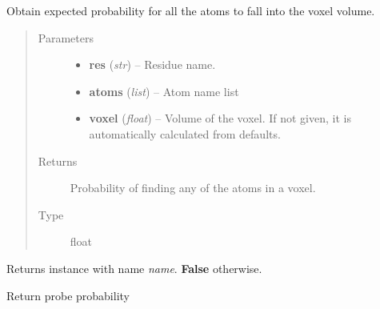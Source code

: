 \documentclass[letterpaper,10pt,english]{sphinxmanual}
\begin{document}
\begin{fulllineitems}
\begin{fulllineitems}
\end{fulllineitems}


\begin{fulllineitems}
\label{solvents:pyMDMix.Solvents.Solvent.getProbability}
Obtain expected probability for all the atoms to fall into the voxel volume.
\begin{quote}\begin{description}
\item[{Parameters}] \leavevmode\begin{itemize}
\item {} 
\textbf{res} (\emph{str}) -- Residue name.

\item {} 
\textbf{atoms} (\emph{list}) -- Atom name list

\item {} 
\textbf{voxel} (\emph{float}) -- Volume of the voxel.
If not given, it is automatically calculated from defaults.

\end{itemize}

\item[{Returns}] \leavevmode
Probability of finding any of the atoms in a voxel.

\item[{Type}] \leavevmode
float

\end{description}\end{quote}

\end{fulllineitems}


\begin{fulllineitems}
\label{solvents:pyMDMix.Solvents.Solvent.getProbeByName}
Returns {\hyperref[containers:pyMDMix.containers.Probe]{}} instance with name \emph{name}. \textbf{False} otherwise.

\end{fulllineitems}


\begin{fulllineitems}
\label{solvents:pyMDMix.Solvents.Solvent.getProbeProbability}
Return probe probability


\end{fulllineitems}
\end{fulllineitems}
\end{document}
